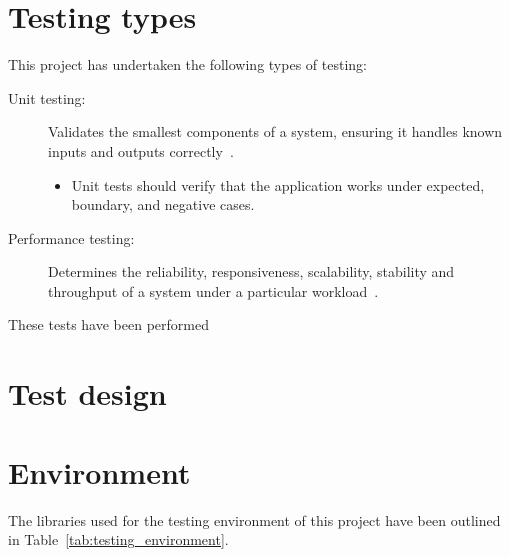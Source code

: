 \section{Testing types} {
\label{sec:testing_types}

	This project has undertaken the following types of testing:

	\begin{description}
		\item[Unit testing:] Validates the smallest components of a system, ensuring it handles known inputs and outputs correctly~\parencite{atlassian2015testing}.
			\begin{itemize}
				\item Unit tests should verify that the application works under expected, boundary, and negative cases.
			\end{itemize}
		\item[Performance testing:] Determines the reliability, responsiveness, scalability, stability and throughput of a system under a particular workload~\parencite{microsoft2015performance}.
	\end{description}


	These tests have been performed 

}

\section{Test design} {
\label{sec:test_design}





	
}

\section{Environment} {
\label{sec:testing_environment}

	The libraries used for the testing environment of this project have been outlined in Table~\ref{tab:testing_environment}.

	

}

